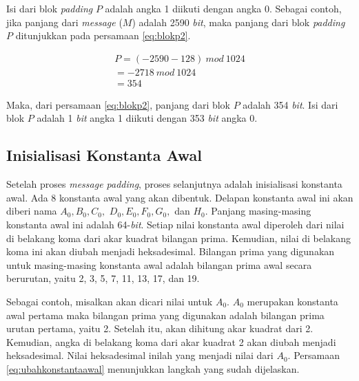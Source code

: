 Isi dari blok \textit{padding} \begin{math}P\end{math} adalah angka 1 diikuti dengan angka 0. Sebagai contoh, jika panjang dari \textit{message} (\begin{math}M\end{math}) adalah 2590 \textit{bit}, maka panjang dari blok \textit{padding} \begin{math}P\end{math} ditunjukkan pada persamaan \ref{eq:blokp2}.

\begin{gather}
	P = (-2590 - 128)\: mod\: 1024 \nonumber \\
		= -2718\: mod\: 1024 \label{eq:blokp2} \\
		= 354 \nonumber
\end{gather}

Maka, dari persamaan \ref{eq:blokp2}, panjang dari blok \begin{math}P\end{math} adalah 354 \textit{bit}. Isi dari blok \begin{math}P\end{math} adalah 1 \textit{bit} angka 1 diikuti dengan 353 \textit{bit} angka 0.

\subsection{Inisialisasi Konstanta Awal}

Setelah proses \textit{message padding}, proses selanjutnya adalah inisialisasi konstanta awal. Ada 8 konstanta awal yang akan dibentuk. Delapan konstanta awal ini akan diberi nama \begin{math}A_0, B_0, C_0, \end{math} \begin{math}D_0, E_0, F_0, G_0,\end{math} dan \begin{math}H_0\end{math}. Panjang masing-masing konstanta awal ini adalah 64-\textit{bit}. Setiap nilai konstanta awal diperoleh dari nilai di belakang koma dari akar kuadrat bilangan prima. Kemudian, nilai di belakang koma ini akan diubah menjadi heksadesimal. Bilangan prima yang digunakan untuk masing-masing konstanta awal adalah bilangan prima awal secara berurutan, yaitu 2, 3, 5, 7, 11, 13, 17, dan 19.

Sebagai contoh, misalkan akan dicari nilai untuk \begin{math}A_0\end{math}. \begin{math}A_0\end{math} merupakan konstanta awal pertama maka bilangan prima yang digunakan adalah bilangan prima urutan pertama, yaitu 2. Setelah itu, akan dihitung akar kuadrat dari 2. Kemudian, angka di belakang koma dari akar kuadrat 2 akan diubah menjadi heksadesimal. Nilai heksadesimal inilah yang menjadi nilai dari \begin{math}A_0\end{math}. Persamaan \ref{eq:ubahkonstantaawal} menunjukkan langkah yang sudah dijelaskan.


